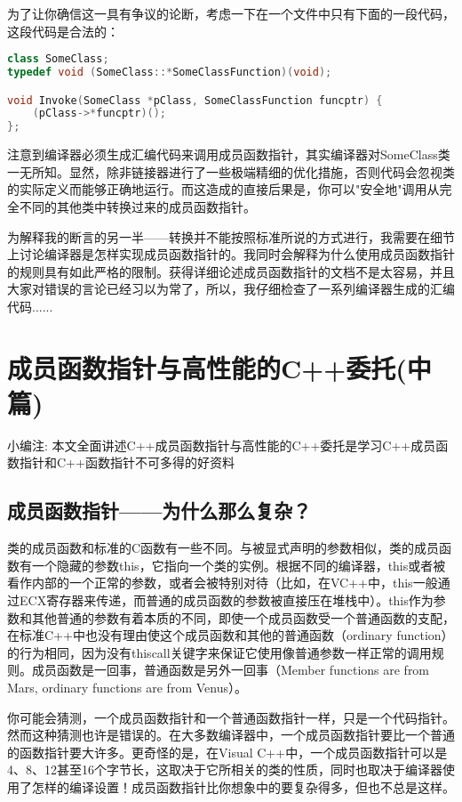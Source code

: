 \documentclass{article}
\begin{document}
\begin{CJK}{UTF8}{gbsn}
为了让你确信这一具有争议的论断，考虑一下在一个文件中只有下面的一段代码，这段代码是合法的：
\begin{lstlisting}[language=c++]
class SomeClass;
typedef void (SomeClass::*SomeClassFunction)(void);

void Invoke(SomeClass *pClass, SomeClassFunction funcptr) {
    (pClass->*funcptr)();
};
\end{lstlisting}
注意到编译器必须生成汇编代码来调用成员函数指针，其实编译器对SomeClass类一无所知。显然，除非链接器进行了一些极端精细的优化措施，否则代码会忽视类的实际定义而能够正确地运行。而这造成的直接后果是，你可以"安全地"调用从完全不同的其他类中转换过来的成员函数指针。

为解释我的断言的另一半——转换并不能按照标准所说的方式进行，我需要在细节上讨论编译器是怎样实现成员函数指针的。我同时会解释为什么使用成员函数指针的规则具有如此严格的限制。获得详细论述成员函数指针的文档不是太容易，并且大家对错误的言论已经习以为常了，所以，我仔细检查了一系列编译器生成的汇编代码......


\section{成员函数指针与高性能的C++委托(中篇)}
小编注: 本文全面讲述C++成员函数指针与高性能的C++委托是学习C++成员函数指针和C++函数指针不可多得的好资料
 
\subsection{成员函数指针——为什么那么复杂？}
类的成员函数和标准的C函数有一些不同。与被显式声明的参数相似，类的成员函数有一个隐藏的参数this，它指向一个类的实例。根据不同的编译器，this或者被看作内部的一个正常的参数，或者会被特别对待（比如，在VC++中，this一般通过ECX寄存器来传递，而普通的成员函数的参数被直接压在堆栈中）。this作为参数和其他普通的参数有着本质的不同，即使一个成员函数受一个普通函数的支配，在标准C++中也没有理由使这个成员函数和其他的普通函数（ordinary function）的行为相同，因为没有thiscall关键字来保证它使用像普通参数一样正常的调用规则。成员函数是一回事，普通函数是另外一回事（Member functions are from Mars, ordinary functions are from Venus）。

你可能会猜测，一个成员函数指针和一个普通函数指针一样，只是一个代码指针。然而这种猜测也许是错误的。在大多数编译器中，一个成员函数指针要比一个普通的函数指针要大许多。更奇怪的是，在Visual C++中，一个成员函数指针可以是4、8、12甚至16个字节长，这取决于它所相关的类的性质，同时也取决于编译器使用了怎样的编译设置！成员函数指针比你想象中的要复杂得多，但也不总是这样。


\end{CJK}
\end{document}
